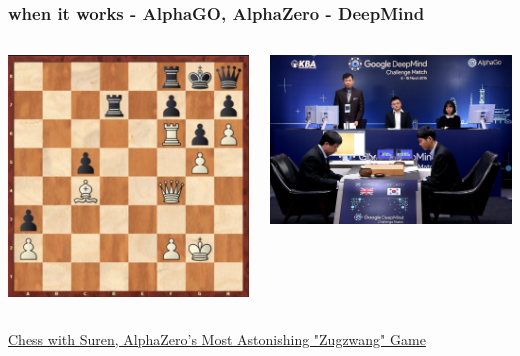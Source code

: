 \documentclass{beamer}
\begin{document}
\begin{frame}
  
  \frametitle{when it works - AlphaGO, AlphaZero - DeepMind} 

  \begin{columns}

    \begin{column}{0.5\textwidth}
      \centering
      \includegraphics[scale=0.3]{../images/alpha_zero_chess.png}
    \end{column}

    \begin{column}{0.5\textwidth}
      \centering
      \includegraphics[scale=0.15]{../images/alpha_go.jpeg}
    \end{column}

  \end{columns}

  {\href{https://www.youtube.com/watch?v=tMab3jcTV0s}{Chess with Suren, AlphaZero's Most Astonishing "Zugzwang" Game}}

\end{frame}
\end{document}
